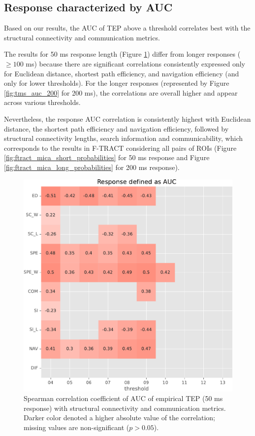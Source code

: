 \subsection{Response characterized by AUC}

Based on our results, the AUC of TEP above a threshold correlates best with the structural connectivity and communication metrics.

The results for 50 ms response length (Figure \ref{fig:tms_auc_50}) differ from longer responses ($\geq100$ ms) because there are significant correlations consistently expressed only for Euclidean distance, shortest path efficiency, and navigation efficiency (and only for lower thresholds). For the longer responses (represented by Figure \ref{fig:tms_auc_200} for 200 ms), the correlations are overall higher and appear across various thresholds. 

Nevertheless, the response AUC correlation is consistently highest with Euclidean distance, the shortest path efficiency and navigation efficiency, followed by structural connectivity lengths, search information and communicability, which corresponds to the results in F-TRACT considering all pairs of ROIs (Figure \ref{fig:ftract_mica_short_probabilities} for 50 ms response and Figure \ref{fig:ftract_mica_long_probabilities} for 200 ms response).

\begin{figure}
    \centering
    \includegraphics[width=\textwidth]{images/nootebook_generated/tmseeg_results/empirical/50/not_over_threshold_nan/Response defined as AUC.pdf}
    \caption[TEPs AUC (50 ms) correlation with SC and communication metrics]{Spearman correlation coefficient of AUC of empirical TEP (50 ms response) with structural connectivity and communication metrics. Darker color denoted a higher absolute value of the correlation; missing values are non-significant ($p>0.05$).}
    \label{fig:tms_auc_50}
\end{figure}

